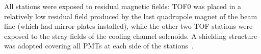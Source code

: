 
All stations were exposed to residual magnetic fields: TOF0 was placed in a relatively low residual field produced by the last quadrupole magnet of the beam line  (which had mirror plates installed), while the other two TOF stations were exposed to the stray fields of the cooling channel solenoids. A shielding structure was adopted covering all PMTs at each side of the stations~\cite{2010NIMPA.615...14B}.


